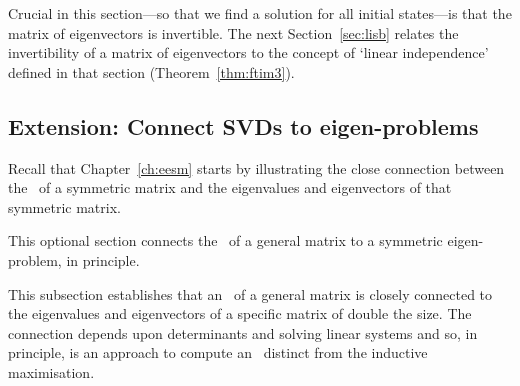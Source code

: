 Crucial in this section---so that we find a solution for all initial states---is that the matrix of eigenvectors is invertible.
The next Section~\ref{sec:lisb} relates the invertibility of a matrix of eigenvectors to the concept of `linear independence' defined in that section (Theorem~\ref{thm:ftim3}).
















\subsection{Extension: Connect SVDs to eigen-problems}

Recall that Chapter~\ref{ch:eesm} starts by illustrating the close connection between the \svd\ of a symmetric matrix and the eigenvalues and eigenvectors of that symmetric matrix.
\begin{aside}
This optional section connects the \svd\ of a general matrix to a symmetric eigen-problem, in principle.
\end{aside}%
This subsection establishes that an \svd\ of a general matrix is closely connected to the eigenvalues and eigenvectors of a specific matrix of double the size.   
The connection depends upon determinants and solving linear systems and so, in principle, is an approach to compute an \svd\ distinct from the inductive maximisation.



